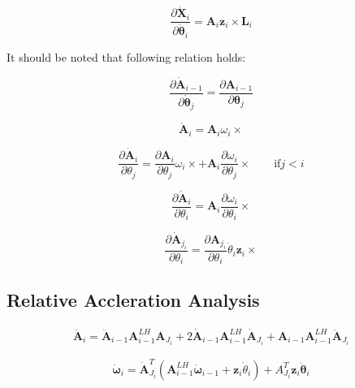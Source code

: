 \documentclass{article}
\begin{document}
\begin{equation}
\frac{\partial \dot{\mathbf X}_i}{\partial \dot{\mathbf \theta}_i}={\mathbf A}_{i}{\mathbf z}_i{\times}{\mathbf L}_i
\end{equation}

It should be noted that following relation holds:

\begin{equation}
\frac{\partial \mathbf{\dot A}_{i-1}}{\partial \mathbf{\dot \theta}_j } =
\frac{\partial \mathbf{A}_{i-1}}{\partial \mathbf{\theta}_j } 
\end{equation}

\begin{equation}
\mathbf{\dot A}_i = \mathbf{A}_i\omega_i\times
\end{equation}

\begin{equation}
\frac{\partial \mathbf{\dot A}_i}{\partial \theta_j}=
\frac{\partial \mathbf{A}_i}{\partial \theta_j}\omega_i\times +
\mathbf{A}_i\frac{\partial \omega_i}{\partial \theta_j}\times
	\qquad \textrm{if} j < i
\end{equation}

\begin{equation}
\frac{\partial \mathbf{\dot A}_i}{\partial \theta_i}=
\mathbf{A}_i\frac{\partial \omega_i}{\partial \theta_i}\times
\end{equation}

\begin{displaymath}
\frac{\partial \mathbf{\dot A}_{j_i}}{\partial \theta_i}=
\frac{\partial \mathbf{A}_{j_i}}{\partial \theta_i}
\dot{\theta}_i\mathbf{z}_i\times
\end{displaymath}

\subsection{Relative Accleration Analysis}

\begin{eqnarray}
\mathbf{\ddot A}_i 
= \mathbf{\ddot A}_{i-1}\mathbf{A}^{LH}_{i-1}\mathbf{A}_{J_i}+2\mathbf{\dot A}_{i-1}\mathbf{A}^{LH}_{i-1}\mathbf{\dot A}_{J_i}
+ \mathbf{A}_{i-1}\mathbf{A}^{LH}_{i-1}\mathbf{\ddot A}_{J_i}
\end{eqnarray}

\begin{equation}
	\mathbf{\dot \omega}_i = 
	\mathbf{\dot A}^{T}_{J_i}(\mathbf{A}^{LH}_{i-1}\mathbf{\dot \omega}_{i-1}+\mathbf{z}_i\dot{\theta}_i) 
	+A^T_{J_i}\mathbf{z}_i\mathbf{\ddot \theta}_{i}
\end{equation}
\end{document}
